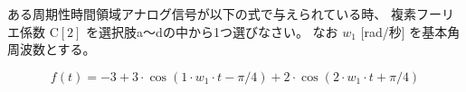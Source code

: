 ある周期性時間領域アナログ信号が以下の式で与えられている時、
複素フーリエ係数 $\textrm{C}[2]$ を選択肢a〜dの中から1つ選びなさい。
なお $w_1$ [rad/秒] を基本角周波数とする。

\[
f(t) = 
-3
+ 3 \cdot \cos( 1 \cdot w_1 \cdot t - \pi/4 )
+ 2 \cdot \cos( 2 \cdot w_1 \cdot t + \pi/4 )
\]
